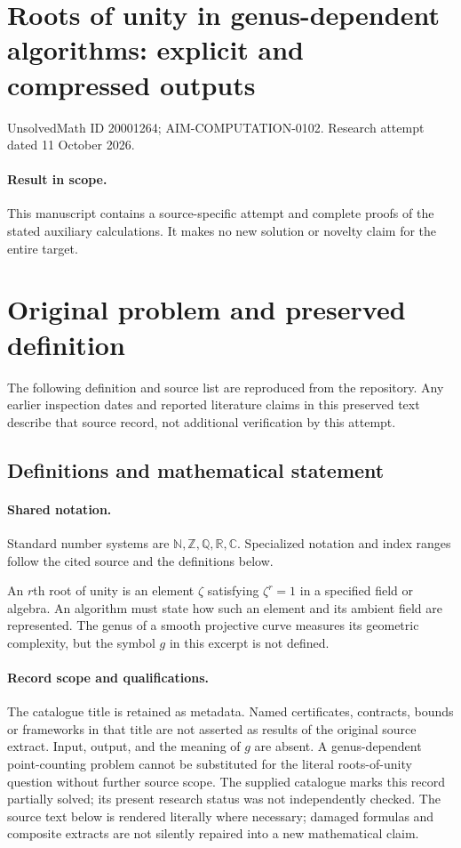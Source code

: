 \documentclass[11pt]{article}
\begin{document}
\section*{Roots of unity in genus-dependent algorithms: explicit and compressed outputs}
\noindent UnsolvedMath ID 20001264; AIM-COMPUTATION-0102. Research attempt dated 11 October 2026.
\paragraph{Result in scope.}This manuscript contains a source-specific attempt and complete proofs of the stated auxiliary calculations. It makes no new solution or novelty claim for the entire target.
\section{Original problem and preserved definition}
The following definition and source list are reproduced from the repository. Any earlier inspection dates and reported literature claims in this preserved text describe that source record, not additional verification by this attempt.
\subsection{Definitions and mathematical statement}

\paragraph{Shared notation.}Standard number systems are $\mathbb N,\mathbb Z,\mathbb Q,\mathbb R,\mathbb C$. Specialized notation and index ranges follow the cited source and the definitions below.


An $r$th root of unity is an element $\zeta$ satisfying $\zeta^r=1$ in a specified field or algebra. An algorithm must state how such an element and its ambient field are represented. The genus of a smooth projective curve measures its geometric complexity, but the symbol $g$ in this excerpt is not defined.
\paragraph{Record scope and qualifications.}
The catalogue title is retained as metadata. Named certificates, contracts, bounds or frameworks in that title are not asserted as results of the original source extract.
Input, output, and the meaning of $g$ are absent. A genus-dependent point-counting problem cannot be substituted for the literal roots-of-unity question without further source scope. The supplied catalogue marks this record partially solved; its present research status was not independently checked.
The source text below is rendered literally where necessary; damaged formulas and composite extracts are not silently repaired into a new mathematical claim.
\end{document}
